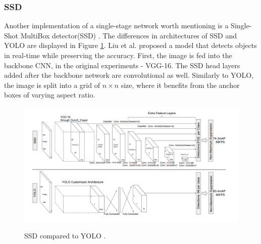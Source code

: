 


\subsubsection{SSD}
Another implementation of a single-stage network worth mentioning is a Single-Shot MultiBox detector(SSD) \cite{Liu2015}. The differences in architectures of SSD and YOLO are displayed in Figure \ref{ssd}. Liu et al. proposed a model that detects objects in real-time while preserving the accuracy. First, the image is fed into the backbone CNN, in the original experiments - VGG-16. The SSD head layers added after the backbone network are convolutional as well. Similarly to YOLO, the image is split into a grid of $n\times n$ size, where it benefits from the anchor boxes of varying aspect ratio. 


\begin{figure}[htb]
	\begin{center}
		\includegraphics[width=14cm]{./ssd_yolo.png}
	\end{center}
	\caption{SSD compared to YOLO \cite{Liu2015}.}
	\begin{center}
		\label{ssd}
	\end{center}
\end{figure}
\FloatBarrier

